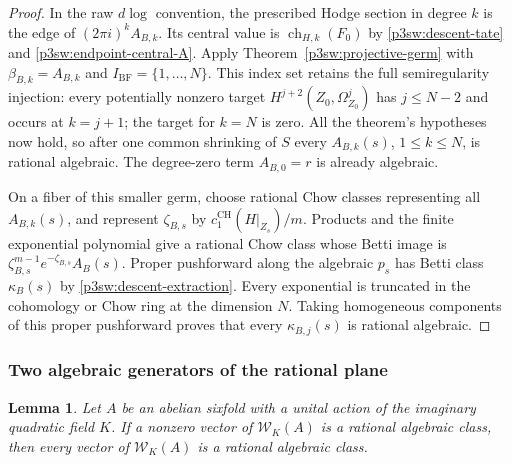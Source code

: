 \documentclass[11pt]{article}
\newtheorem{lemma}[theorem]{Lemma}
\numberwithin{equation}{section}
\begin{document}
\begin{proof}
In the raw \(d\log\) convention, the prescribed Hodge section in
degree \(k\) is the edge of \((2\pi i)^k A_{B,k}\).  Its central
value is \(\operatorname{ch}_{H,k}(F_0)\) by
\eqref{p3sw:descent-tate} and \eqref{p3sw:endpoint-central-A}.
Apply Theorem~\ref{p3sw:projective-germ} with
\(\beta_{B,k}=A_{B,k}\) and \(I_{\mathrm{BF}}=\{1,\ldots,N\}\).
This index set retains the full semiregularity injection: every
potentially nonzero target \(H^{j+2}(Z_0,\Omega_{Z_0}^j)\) has
\(j\leq N-2\) and occurs at \(k=j+1\); the target for \(k=N\)
is zero.  All the theorem's hypotheses now hold, so after one common
shrinking of \(S\) every \(A_{B,k}(s)\), \(1\leq k\leq N\),
is rational algebraic.  The degree-zero term \(A_{B,0}=r\) is
already algebraic.

On a fiber of this smaller germ, choose rational Chow classes
representing all \(A_{B,k}(s)\), and represent \(\zeta_{B,s}\)
by \(c_1^{\mathrm{CH}}(H|_{Z_s})/m\).
Products and the finite exponential polynomial give a rational
Chow class whose Betti image is
\(\zeta_{B,s}^{m-1}e^{-\zeta_{B,s}}A_B(s)\).
Proper pushforward along the algebraic \(p_s\) has Betti class
\(\kappa_B(s)\) by \eqref{p3sw:descent-extraction}.
Every exponential is truncated in the cohomology or Chow ring
at the dimension \(N\).  Taking homogeneous components of this
proper pushforward proves that every \(\kappa_{B,j}(s)\) is
rational algebraic.
\end{proof}

\subsubsection{Two algebraic generators of the rational plane}

\begin{lemma}
\label{p3sw:endpoint-two-generators}
Let \(A\) be an abelian sixfold with a unital action of the imaginary
quadratic field \(K\).  If a nonzero vector of \(\mathcal W_K(A)\)
is a rational algebraic class, then every vector of
\(\mathcal W_K(A)\) is a rational algebraic class.
\end{lemma}
\end{document}
